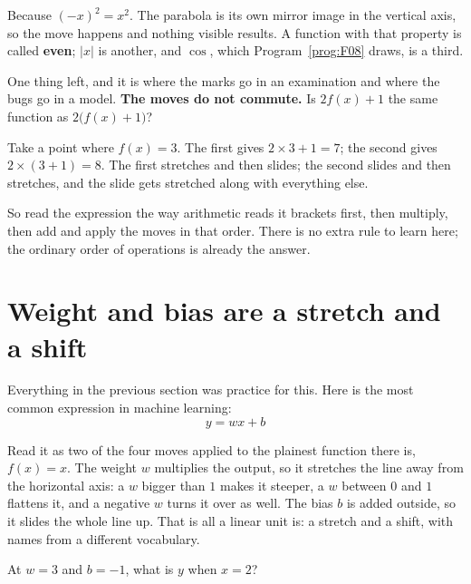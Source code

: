 \begin{fr}
Because $(-x)^{2} = x^{2}$. The parabola is its own mirror image in the
vertical axis, so the move happens and nothing visible results. A function with
that property is called \textbf{even}; $\lvert x \rvert$ is another, and
$\cos$, which Program~\ref{prog:F08} draws, is a third.

One thing left, and it is where the marks go in an examination and where the
bugs go in a model. \textbf{The moves do not commute.} Is $2f(x) + 1$ the same
function as $2\bigl(f(x) + 1\bigr)$?
\nextframe
\end{fr}

\begin{fr}
Take a point where $f(x) = 3$. The first gives $2 \times 3 + 1 = 7$; the second
gives $2 \times (3 + 1) = 8$. The first stretches and then slides; the second
slides and then stretches, and the slide gets stretched along with everything
else.

So read the expression the way arithmetic reads it \dash{} brackets first,
then multiply, then add \dash{} and apply the moves in that order. There is no
extra rule to learn here; the ordinary order of operations is already the
answer.
\end{fr}


\section{Weight and bias are a stretch and a shift}
\label{sec:F05-weight-bias}

\begin{fr}
Everything in the previous section was practice for this. Here is the most
common expression in machine learning:
\[ y = wx + b \]

Read it as two of the four moves applied to the plainest function there is,
$f(x) = x$. The weight $w$ multiplies the output, so it stretches the line away
from the horizontal axis: a $w$ bigger than $1$ makes it steeper, a $w$ between
$0$ and $1$ flattens it, and a negative $w$ turns it over as well. The bias $b$
is added outside,
so it slides the whole line up. That is all a linear unit is: a stretch and a
shift, with names from a different vocabulary.

At $w = 3$ and $b = -1$, what is $y$ when $x = 2$?
\nextframe
\end{fr}

